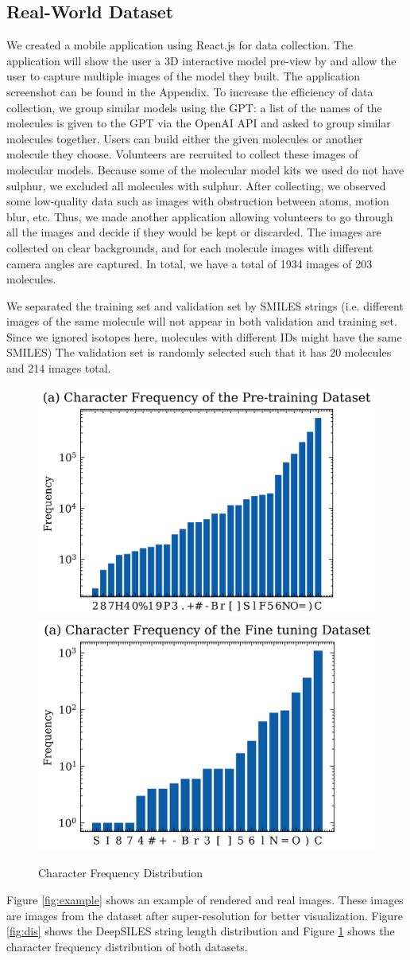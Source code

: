 \documentclass[12pt]{article}
\begin{document}
\subsection{Real-World Dataset}
We created a mobile application using React.js for data collection. The application will show the user a 3D interactive model pre-view by \autocite{rego_3dmoljs_2015} and allow the user to capture multiple images of the model they built. The application screenshot can be found in the Appendix. To increase the efficiency of data collection, we group similar models using the GPT: a list of the names of the molecules is given to the GPT via the OpenAI API and asked to group similar molecules together. Users can build either the given molecules or another molecule they choose. Volunteers are recruited to collect these images of molecular models. Because some of the molecular model kits we used do not have sulphur, we excluded all molecules with sulphur. After collecting, we observed some low-quality data such as images with obstruction between atoms, motion blur, etc. Thus, we made another application allowing volunteers to go through all the images and decide if they would be kept or discarded. The images are collected on clear backgrounds, and for each molecule images with different camera angles are captured. In total, we have a total of 1934 images of 203 molecules. 

We separated the training set and validation set by SMILES strings (i.e. different images of the same molecule will not appear in both validation and training set. Since we ignored isotopes here, molecules with different IDs might have the same SMILES) The validation set is randomly selected such that it has 20 molecules and 214 images total. 

\begin{figure}[t]
    \centering
    \includegraphics[width=0.4\linewidth]{freq1.png}
    \includegraphics[width=0.4\linewidth]{freq2.png}
    \caption{Character Frequency Distribution}
    \label{chardis}
\end{figure}
Figure \ref{fig:example} shows an example of rendered and real images. These images are images from the dataset after super-resolution for better visualization. Figure \ref{fig:dis} shows the DeepSILES string length distribution and Figure \ref{chardis} shows the character frequency distribution of both datasets. 
\end{document}

